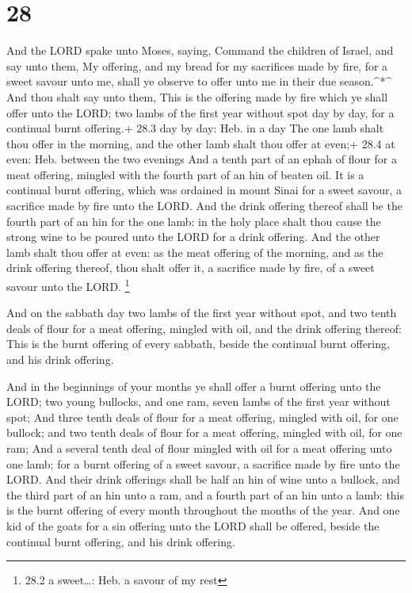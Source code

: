 \hypertarget{section-27}{%
\section{28}\label{section-27}}

 And the LORD spake unto Moses, saying,  Command
the children of Israel, and say unto them, My offering, and my bread for
my sacrifices made by fire, for a sweet savour unto me, shall ye observe
to offer unto me in their due season.\^{}*\^{}  And thou
shalt say unto them, This is the offering made by fire which ye shall
offer unto the LORD; two lambs of the first year without spot day by
day, for a continual burnt offering.+ 28.3 day by day: Heb. in a day
 The one lamb shalt thou offer in the morning, and the other
lamb shalt thou offer at even;+ 28.4 at even: Heb. between the two
evenings  And a tenth part of an ephah of flour for a meat
offering, mingled with the fourth part of an hin of beaten oil.
 It is a continual burnt offering, which was ordained in
mount Sinai for a sweet savour, a sacrifice made by fire unto the LORD.
 And the drink offering thereof shall be the fourth part of
an hin for the one lamb: in the holy place shalt thou cause the strong
wine to be poured unto the LORD for a drink offering.  And
the other lamb shalt thou offer at even: as the meat offering of the
morning, and as the drink offering thereof, thou shalt offer it, a
sacrifice made by fire, of a sweet savour unto the LORD. \footnote{28.2
  a sweet\ldots: Heb. a savour of my rest}

 And on the sabbath day two lambs of the first year without
spot, and two tenth deals of flour for a meat offering, mingled with
oil, and the drink offering thereof:  This is the burnt
offering of every sabbath, beside the continual burnt offering, and his
drink offering.

 And in the beginnings of your months ye shall offer a
burnt offering unto the LORD; two young bullocks, and one ram, seven
lambs of the first year without spot;  And three tenth
deals of flour for a meat offering, mingled with oil, for one bullock;
and two tenth deals of flour for a meat offering, mingled with oil, for
one ram;  And a several tenth deal of flour mingled with
oil for a meat offering unto one lamb; for a burnt offering of a sweet
savour, a sacrifice made by fire unto the LORD.  And their
drink offerings shall be half an hin of wine unto a bullock, and the
third part of an hin unto a ram, and a fourth part of an hin unto a
lamb: this is the burnt offering of every month throughout the months of
the year.  And one kid of the goats for a sin offering unto
the LORD shall be offered, beside the continual burnt offering, and his
drink offering.

